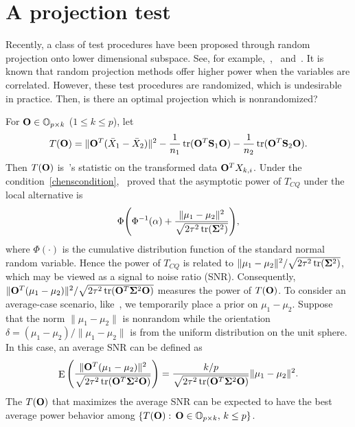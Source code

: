 \documentclass[3p]{elsarticle}
\DeclareMathOperator{\mytr}{tr}
\DeclareMathOperator{\myE}{E}
\theoremstyle{plain}
\theoremstyle{definition}
\theoremstyle{remark}
\begin{document}
\section{A projection test}\label{methodology}


Recently, a class of test procedures have been proposed through random projection onto lower dimensional subspace. See, for example,~\cite{Lopes2015A},~\cite{Thulin2014A} and~\cite{Srivastava2014RAPTT}.
It is known that random projection methods offer higher power when the variables are correlated.
However, these test procedures are randomized, which is undesirable in practice.
Then, is there an optimal projection which is nonrandomized?

For $\mathbf{O}\in \mathbb{O}_{p\times k}$ ($1\leq k\leq p$), let
$$
    T(\BO)=\|\BO^T(\bar{X}_1-\bar{X}_2)\|^2-\frac{1}{n_1}\mytr(\BO^T \BS_1\BO)-\frac{1}{n_2}\mytr(\BO^T \BS_2\BO).
$$
Then $T(\mathbf{O})$ is~\cite{Chen2010A}'s statistic on the transformed data $\mathbf{O}^T X_{k,i}$.
Under the condition~\eqref{chenscondition},~\cite{Chen2010A} proved that the asymptotic power of $T_{CQ}$ under the local alternative is
$$
\Phi\Bigg(\Phi^{-1}(\alpha)+\frac{\|\mu_1-\mu_2\|^2}{\sqrt{2\tau^2\mytr(\bSigma^2)}}\Bigg),
$$
where $\Phi(\cdot)$ is the cumulative distribution function of the standard normal random variable.
Hence the power of $T_{CQ}$ is related to $\|\mu_1-\mu_2\|^2/\sqrt{2\tau^2\mytr(\bSigma^2)}$, which may be viewed as a signal to noise ratio (SNR).
Consequently, $\|\BO^T (\mu_1-\mu_2)\|^2/\sqrt{2\tau^2\mytr(\BO^T \bSigma^2 \BO)}$ measures the power of $T(\mathbf{O})$.
{\color{red}
To consider an average-case scenario, like~\cite{Lopes2015A}, we temporarily place a prior on $\mu_1-\mu_2$.
}
Suppose that the norm $\|\mu_1-\mu_2\|$ is nonrandom while the orientation $\delta=(\mu_1-\mu_2)/\|\mu_1-\mu_2\|$ is from the uniform distribution on the unit sphere.
In this case, an average SNR can be defined as
\begin{equation}\label{touteng}
\myE \Bigg( \frac{\|\BO^T (\mu_1-\mu_2)\|^2}{\sqrt{2\tau^2\mytr(\BO^T \bSigma^2 \BO)}}\Bigg)
=  \frac{k/p}{\sqrt{2\tau^2\mytr(\BO^T \bSigma^2 \BO)}}\|\mu_1-\mu_2\|^2.
\end{equation}
The $T(\mathbf{O})$ that maximizes the average SNR can be expected to have the best average power behavior among $\{T(\mathbf{O}):\, \mathbf{O}\in \mathbb{O}_{p\times k},\,  k\leq p\}$.
\end{document}
